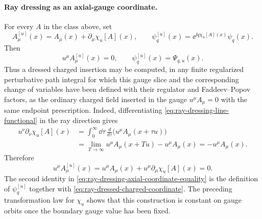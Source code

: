 \paragraph{Ray dressing as an axial-gauge coordinate.}
For every \(A\) in the class above, set
\[
  A_\mu^{[u]}(x)=A_\mu(x)+\partial_\mu\chi_u[A](x),
  \qquad
  \psi_q^{[u]}(x)=\ee^{\ii q\chi_u[A](x)}\psi_q(x).
\]
Then
\begin{equation}
  u^\mu A_\mu^{[u]}(x)=0,
  \qquad
  \psi_q^{[u]}(x)=\Psi_{q,u}(x).
  \label{eq:ray-dressing-axial-coordinate-equality}
\end{equation}
Thus a dressed charged insertion may be computed, in any finite regularized
perturbative path integral for which this gauge slice and the corresponding
change of variables have been defined with their regulator and
Faddeev--Popov factors, as the ordinary charged field inserted in the gauge
\(u^\mu A_\mu=0\) with the same endpoint prescription.
Indeed, differentiating \eqref{eq:ray-dressing-line-functional} in the ray
direction gives
\[
\begin{aligned}
  u^\nu\partial_\nu\chi_u[A](x)
  &=
  \int_0^\infty\dd\tau\,
  \frac{d}{d\tau}\bigl(u^\mu A_\mu(x+\tau u)\bigr)
  \\
  &=
  \lim_{T\to\infty}u^\mu A_\mu(x+Tu)-u^\mu A_\mu(x)
  =
  -u^\mu A_\mu(x).
\end{aligned}
\]
Therefore
\[
  u^\mu A_\mu^{[u]}(x)
  =
  u^\mu A_\mu(x)+u^\mu\partial_\mu\chi_u[A](x)
  =
  0 .
\]
The second identity in
\eqref{eq:ray-dressing-axial-coordinate-equality} is the definition of
\(\psi_q^{[u]}\) together with \eqref{eq:ray-dressed-charged-coordinate}.
The preceding transformation law for \(\chi_u\) shows that this construction
is constant on gauge orbits once the boundary gauge value has been fixed.

